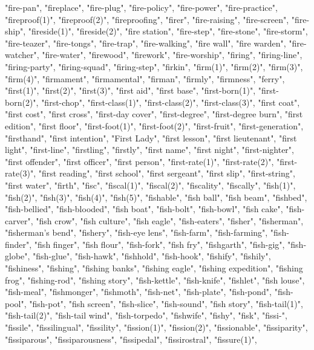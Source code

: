 "fire-pan",
"fireplace",
"fire-plug",
"fire-policy",
"fire-power",
"fire-practice",
"fireproof(1)",
"fireproof(2)",
"fireproofing",
"firer",
"fire-raising",
"fire-screen",
"fire-ship",
"fireside(1)",
"fireside(2)",
"fire station",
"fire-step",
"fire-stone",
"fire-storm",
"fire-teazer",
"fire-tongs",
"fire-trap",
"fire-walking",
"fire wall",
"fire warden",
"fire-watcher",
"fire-water",
"firewood",
"firework",
"fire-worship",
"firing",
"firing-line",
"firing-party",
"firing-squad",
"firing-step",
"firkin",
"firm(1)",
"firm(2)",
"firm(3)",
"firm(4)",
"firmament",
"firmamental",
"firman",
"firmly",
"firmness",
"ferry",
"first(1)",
"first(2)",
"first(3)",
"first aid",
"first base",
"first-born(1)",
"first-born(2)",
"first-chop",
"first-class(1)",
"first-class(2)",
"first-class(3)",
"first coat",
"first cost",
"first cross",
"first-day cover",
"first-degree",
"first-degree burn",
"first edition",
"first floor",
"first-foot(1)",
"first-foot(2)",
"first-fruit",
"first-generation",
"firsthand",
"first intention",
"First Lady",
"first lesson",
"first lieutenant",
"first light",
"first-line",
"firstling",
"firstly",
"first name",
"first night",
"first-nighter",
"first offender",
"first officer",
"first person",
"first-rate(1)",
"first-rate(2)",
"first-rate(3)",
"first reading",
"first school",
"first sergeant",
"first slip",
"first-string",
"first water",
"firth",
"fisc",
"fiscal(1)",
"fiscal(2)",
"fiscality",
"fiscally",
"fish(1)",
"fish(2)",
"fish(3)",
"fish(4)",
"fish(5)",
"fishable",
"fish ball",
"fish beam",
"fishbed",
"fish-bellied",
"fish-blooded",
"fish boat",
"fish-bolt",
"fish-bowl",
"fish cake",
"fish-carver",
"fish crow",
"fish culture",
"fish eagle",
"fish-eaters",
"fisher",
"fisherman",
"fisherman's bend",
"fishery",
"fish-eye lens",
"fish-farm",
"fish-farming",
"fish-finder",
"fish finger",
"fish flour",
"fish-fork",
"fish fry",
"fishgarth",
"fish-gig",
"fish-globe",
"fish-glue",
"fish-hawk",
"fishhold",
"fish-hook",
"fishify",
"fishily",
"fishiness",
"fishing",
"fishing banks",
"fishing eagle",
"fishing expedition",
"fishing frog",
"fishing-rod",
"fishing story",
"fish-kettle",
"fish-knife",
"fishlet",
"fish louse",
"fish-meal",
"fishmonger",
"fishmoth",
"fish-net",
"fish-plate",
"fish-pond",
"fish-pool",
"fish-pot",
"fish screen",
"fish-slice",
"fish-sound",
"fish story",
"fish-tail(1)",
"fish-tail(2)",
"fish-tail wind",
"fish-torpedo",
"fishwife",
"fishy",
"fisk",
"fissi-",
"fissile",
"fissilingual",
"fissility",
"fission(1)",
"fission(2)",
"fissionable",
"fissiparity",
"fissiparous",
"fissiparousness",
"fissipedal",
"fissirostral",
"fissure(1)",
